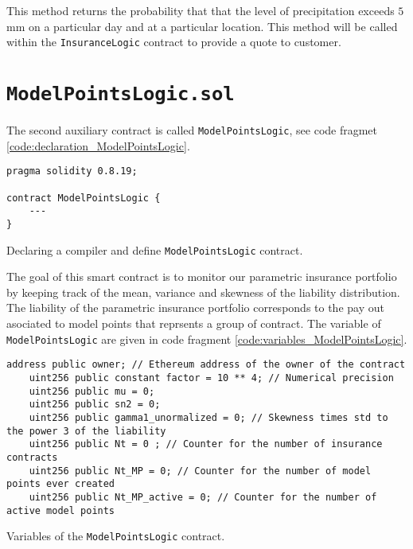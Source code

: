 \documentclass[10pt]{article}
\begin{document}
 This method returns the probability that that the level of precipitation exceeds $5$mm on a particular day and at a particular location. This method will be called within the \texttt{InsuranceLogic} contract to provide a quote to customer. 

\section{\texttt{ModelPointsLogic.sol}}\label{sec:modelpointslogic_sol}

The second auxiliary contract is called \texttt{ModelPointsLogic}, see code fragmet \ref{code:declaration_ModelPointsLogic}.

\begin{codefragment}[!h]
\begin{lstlisting}[language=Solidity]
pragma solidity 0.8.19;

contract ModelPointsLogic {
    ---
}
\end{lstlisting}
    \caption{Declaring a compiler and define \texttt{ModelPointsLogic} contract.}
    \label{code:declaration_ModelPointsLogic}
\end{codefragment}

The goal of this smart contract is to monitor our parametric insurance portfolio by keeping track of the mean, variance and skewness of the liability distribution. The liability of the parametric insurance portfolio corresponds to the pay out asociated to model points that reprsents a group of contract. The variable of \texttt{ModelPointsLogic} are given in code fragment \ref{code:variables_ModelPointsLogic}.

\begin{codefragment}[!h]
\begin{lstlisting}[language=Solidity]
    address public owner; // Ethereum address of the owner of the contract
    uint256 public constant factor = 10 ** 4; // Numerical precision
    uint256 public mu = 0;
    uint256 public sn2 = 0;
    uint256 public gamma1_unormalized = 0; // Skewness times std to the power 3 of the liability
    uint256 public Nt = 0 ; // Counter for the number of insurance contracts
    uint256 public Nt_MP = 0; // Counter for the number of model points ever created
    uint256 public Nt_MP_active = 0; // Counter for the number of active model points
\end{lstlisting}
    \caption{Variables of the \texttt{ModelPointsLogic} contract.}
    \label{code:variables_ModelPointsLogic}
\end{codefragment}
\end{document}
